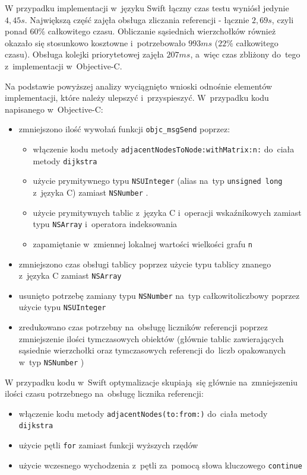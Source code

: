 \documentclass[mgr, shortabstract]{iithesis}
\newcommand{\swiftinline}[1]{
    \texttt{#1}
}
\newcommand{\objcinline}[1]{
    \texttt{#1}
}
\begin{document}
W przypadku implementacji w~języku Swift łączny czas testu wyniósł jedynie $4,45s$. Największą część zajęła obsługa zliczania referencji - łącznie $2,69s$, czyli ponad $60\%$ całkowitego czasu. Obliczanie sąsiednich wierzchołków również okazało się stosunkowo kosztowne i~potrzebowało $993ms$ ($22\%$ całkowitego czasu). Obsługa kolejki priorytetowej zajęła $207ms$, a~więc czas zbliżony do~tego z~implementacji w~Objective-C.

Na podstawie powyższej analizy wyciągnięto wnioski odnośnie elementów implementacji, które należy ulepszyć i~przyspieszyć. W~przypadku kodu napisanego w~Objective-C:

\begin{itemize}
    \item zmniejszono ilość wywołań funkcji \objcinline{objc_msgSend} poprzez:
    \begin{itemize}
        \item włączenie kodu metody \objcinline{adjacentNodesToNode:withMatrix:n:} do~ciała metody \objcinline{dijkstra}
        \item użycie prymitywnego typu \objcinline{NSUInteger} (alias na~typ \objcinline{unsigned long} z~języka C) zamiast \objcinline{NSNumber}.
        \item użycie prymitywnych tablic z~języka C i~operacji wskaźnikowych zamiast typu \objcinline{NSArray} i~operatora indeksowania
        \item zapamiętanie w~zmiennej lokalnej wartości wielkości grafu \objcinline{n}
    \end{itemize}
    \item zmniejszono czas obsługi tablicy poprzez użycie typu tablicy znanego z~języka C zamiast \objcinline{NSArray}
    \item usunięto potrzebę zamiany typu \objcinline{NSNumber} na~typ całkowitoliczbowy poprzez użycie typu \objcinline{NSUInteger}
    \item zredukowano czas potrzebny na~obsługę liczników referencji poprzez zmniejszenie ilości tymczasowych obiektów (głównie tablic zawierających sąsiednie wierzchołki oraz tymczasowych referencji do~liczb opakowanych w~typ \objcinline{NSNumber})
\end{itemize}

W przypadku kodu w~Swift optymalizacje skupiają się głównie na~zmniejszeniu ilości czasu potrzebnego na~obsługę licznika referencji:

\begin{itemize}
    \item włączenie kodu metody \swiftinline{adjacentNodes(to:from:)} do~ciała metody \swiftinline{dijkstra}
    \item użycie pętli \swiftinline{for} zamiast funkcji wyższych rzędów
    \item użycie wczesnego wychodzenia z~pętli za~pomocą słowa kluczowego \swiftinline{continue}
\end{itemize}
\end{document}
